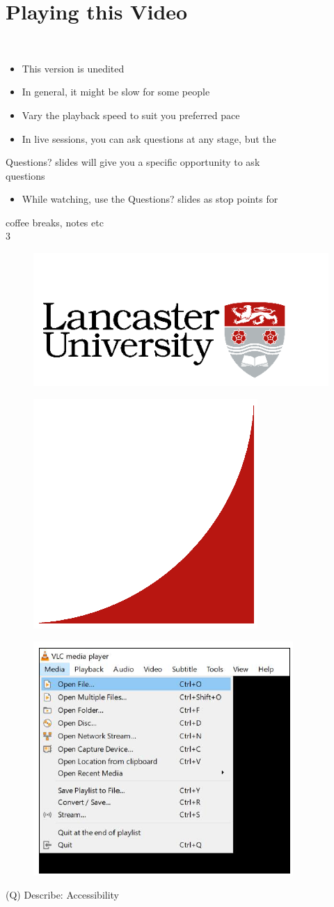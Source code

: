 \documentclass[12pt]{article}
\begin{document}
\section{Playing this Video}
\\
\begin{itemize}
  \item This version is unedited
  \item In general, it might be slow for some people
  \item Vary the playback speed to suit you preferred pace
  \item In live sessions, you can ask questions at any stage, but the 
\end{itemize}
Questions? slides will give you a specific opportunity to ask \\
questions\\
\begin{itemize}
  \item While watching, use the Questions? slides as stop points for 
\end{itemize}
coffee breaks, notes etc\\
3\\
\begin{figure}[H]
\includegraphics[width=0.5\linewidth]{page1-image-1.png}
\end{figure}
\begin{figure}[H]
\includegraphics[width=0.5\linewidth]{page1-image-2.png}
\end{figure}
\begin{figure}[H]
\includegraphics[width=0.5\linewidth]{page1-image-3.png}
\end{figure}
\clearpage
(Q)
Describe: Accessibility
\clearpage
\end{document}
